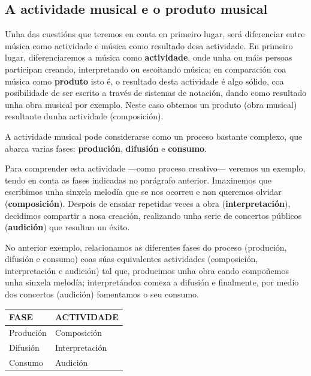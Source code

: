 \documentclass[a4paper, twoside]{templates/ociamthesis}
\begin{document}
\hypertarget{a-actividade-musical-e-o-produto-musical}{%
\subsection*{A actividade musical e o produto musical}\label{a-actividade-musical-e-o-produto-musical}}

Unha das cuestións que teremos en conta en primeiro lugar, será diferenciar entre música como actividade e música como resultado desa actividade. En primeiro lugar, diferenciaremos a música como \textbf{actividade}, onde unha ou máis persoas participan creando, interpretando ou escoitando música; en comparación coa música como \textbf{produto} isto é, o resultado desta actividade é algo sólido, coa posibilidade de ser escrito a través de sistemas de notación, dando como resultado unha obra musical por exemplo. Neste caso obtemos un produto (obra musical) resultante dunha actividade (composición).

A actividade musical pode considerarse como un proceso bastante complexo, que abarca varias fases: \textbf{produción}, \textbf{difusión} e \textbf{consumo}.

Para comprender esta actividade ---como proceso creativo--- veremos un exemplo, tendo en conta as fases indicadas no parágrafo anterior. Imaxinemos que escribimos unha sinxela melodía que se nos ocorreu e non queremos olvidar (\textbf{composición}). Despois de ensaiar repetidas veces a obra (\textbf{interpretación}), decidimos compartir a nosa creación, realizando unha serie de concertos públicos (\textbf{audición}) que resultan un éxito.

No anterior exemplo, relacionamos as diferentes fases do proceso (produción, difusión e consumo) coas súas equivalentes actividades (composición, interpretación e audición) tal que, producimos unha obra cando compoñemos unha sinxela melodía; interpretándoa comeza a difusión e finalmente, por medio dos concertos (audición) fomentamos o seu consumo.

\begin{longtable}[]{@{}ll@{}}
\toprule()
FASE & ACTIVIDADE \\
\midrule()
\endhead
Produción & Composición \\
Difusión & Interpretación \\
Consumo & Audición \\
\bottomrule()
\end{longtable}
\end{document}
